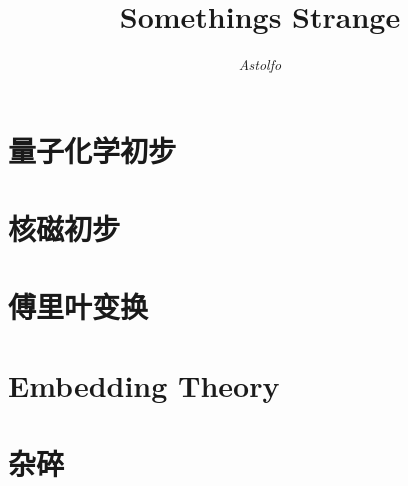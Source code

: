 \documentclass[lang=cn,10pt]{elegantbook}
\title{Somethings Strange}
\author{\textit{Astolfo}}
\begin{document}
\maketitle
\frontmatter


\mainmatter
\tableofcontents
\chapter{量子化学初步}

\chapter{核磁初步}

\chapter{傅里叶变换}

\chapter{Embedding Theory}

\chapter{杂碎}

\end{document}
